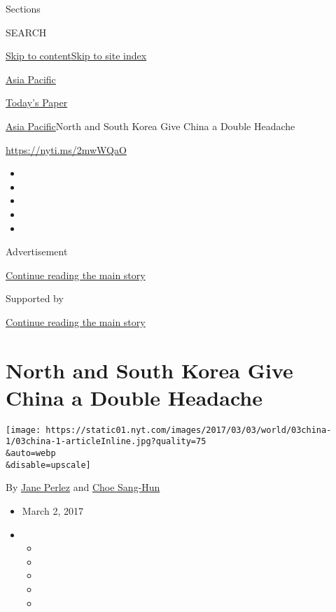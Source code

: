 Sections

SEARCH

\protect\hyperlink{site-content}{Skip to
content}\protect\hyperlink{site-index}{Skip to site index}

\href{https://www.nytimes.com/section/world/asia}{Asia Pacific}

\href{https://myaccount.nytimes.com/auth/login?response_type=cookie\&client_id=vi}{}

\href{https://www.nytimes.com/section/todayspaper}{Today's Paper}

\href{/section/world/asia}{Asia Pacific}\textbar{}North and South Korea
Give China a Double Headache

\url{https://nyti.ms/2mwWQaO}

\begin{itemize}
\item
\item
\item
\item
\item
\end{itemize}

Advertisement

\protect\hyperlink{after-top}{Continue reading the main story}

Supported by

\protect\hyperlink{after-sponsor}{Continue reading the main story}

\hypertarget{north-and-south-korea-give-china-a-double-headache}{%
\section{North and South Korea Give China a Double
Headache}\label{north-and-south-korea-give-china-a-double-headache}}

\texttt{[image: https://static01.nyt.com/images/2017/03/03/world/03china-1/03china-1-articleInline.jpg?quality=75\\\&auto=webp\\\&disable=upscale]}

By \href{http://www.nytimes.com/by/jane-perlez}{Jane Perlez} and
\href{http://www.nytimes.com/by/choe-sang-hun}{Choe Sang-Hun}

\begin{itemize}
\item
  March 2, 2017
\item
  \begin{itemize}
  \item
  \item
  \item
  \item
  \item
  \end{itemize}
\end{itemize}

